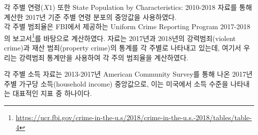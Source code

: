 각 주별 연령($X1$) 또한 State Population by Characteristics: 2010-2018 자료를 통해 계산한 2017년 기준 주별 연령 분포의 중앙값을 사용하였다.
\\
각 주별 범죄율은 FBI에서 제공하는 Uniform Crime Reporting Program 2017-2018의 보고서\footnote{\url{https://ucr.fbi.gov/crime-in-the-u.s/2018/crime-in-the-u.s.-2018/tables/table-4}}를 바탕으로 계산하였다. 자료는 2017년과 2018년의 강력범죄(violent crime)과 재산 범죄(property crime)의 통계를 각 주별로 나타내고 있는데, 여기서 우리는 강력범죄 통계만을 사용하여 각 주의 범죄율을 계산하였다.

각 주별 소득 자료는 2013-2017년 American Community Survey를 통해 나온 2017년 주별 가구당 소득(household income) 중앙값으로, 이는 미국에서 소득 수준을 나타내는 대표적인 지표 중 하나이다.




